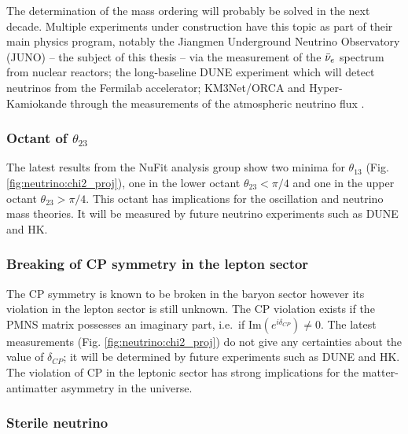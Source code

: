 \documentclass[../main.tex]{subfiles}
\begin{document}
The determination of the mass ordering will probably be solved in the next decade. Multiple experiments under construction have this topic as part of their main physics program, notably the Jiangmen Underground Neutrino Observatory (JUNO) \cite{juno_collaboration_juno_2022} -- the subject of this thesis -- via the measurement of the $\bar{\nu}_{e}$ spectrum from nuclear reactors; the long-baseline DUNE experiment \cite{abi_long-baseline_2020} which will detect neutrinos from the Fermilab accelerator; KM3Net/ORCA and Hyper-Kamiokande through the measurements of the atmospheric neutrino flux \cite{aiello_determining_2021, abe_hyper-kamiokande_2018}.

\subsubsection{Octant of $\theta_{23}$}

The latest results from the NuFit analysis group \cite{esteban_nufit-60_2024} show two minima for $\theta_{13}$ (Fig. \ref{fig:neutrino:chi2_proj}), one in the lower octant $\theta_{23} < \pi/4$ and one in the upper octant $\theta_{23} > \pi/4$. This octant has implications for the oscillation and neutrino mass theories. It will be measured by future neutrino experiments such as DUNE and HK.

\subsubsection{Breaking of CP symmetry in the lepton sector}

The CP symmetry is known to be broken in the baryon sector \cite{christenson_evidence_1964} however its violation in the lepton sector is still unknown. The CP violation exists if the PMNS matrix possesses an imaginary part, i.e.\ if $\text{Im}(e^{i\delta_{CP}}) \neq 0$. The latest measurements (Fig. \ref{fig:neutrino:chi2_proj}) do not give any certainties about the value of $\delta_{CP}$; it will be determined by future experiments such as DUNE and HK. The violation of CP in the leptonic sector has strong implications for the matter-antimatter asymmetry in the universe.

\subsubsection{Sterile neutrino}
\end{document}
